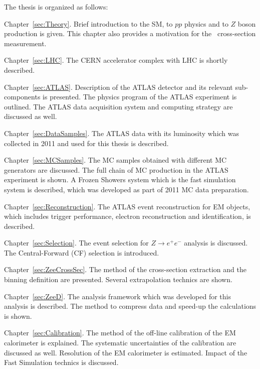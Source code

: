 The thesis is organized as follows:
\begin{description}
\item Chapter~\ref{sec:Theory}. Brief introduction to the SM, to $pp$ physics and to $Z$ boson production is given. This chapter also provides a motivation for the \Zee\ cross-section measurement.

\item Chapter~\ref{sec:LHC}. The CERN accelerator complex with LHC is shortly described.

\item Chapter~\ref{sec:ATLAS}. Description of the ATLAS detector and its relevant sub-components is presented. The physics program of the ATLAS experiment is outlined. The ATLAS data acquisition system and computing strategy are discussed as well.

\item Chapter~\ref{sec:DataSamples}. The ATLAS data with its luminosity which was collected in 2011 and used for this thesis is described.

\item Chapter~\ref{sec:MCSamples}. The MC samples obtained with different MC generators are discussed. The full chain of MC production in the ATLAS experiment is shown. A Frozen Showers system which is the fast simulation system is described, which was developed as part of 2011 MC data preparation.

\item Chapter~\ref{sec:Reconstruction}. The ATLAS event reconstruction for EM objects, which includes trigger performance, electron reconstruction and identification, is described.

\item Chapter~\ref{sec:Selection}. The event selection for $Z \to e^+e^-$ analysis is discussed. The Central-Forward (CF) selection is introduced.

\item Chapter~\ref{sec:ZeeCrossSec}. The method of the cross-section extraction and the binning definition are presented. Several extrapolation technics are shown.

\item Chapter~\ref{sec:ZeeD}. The analysis framework which was developed for this analysis is described. The method to compress data and speed-up the calculations is shown.

\item Chapter~\ref{sec:Calibration}. The method of the off-line calibration of the EM calorimeter is explained. The systematic uncertainties of the calibration are discussed as well. Resolution of the EM calorimeter is estimated. Impact of the Fast Simulation technics is discussed.


\end{description}
